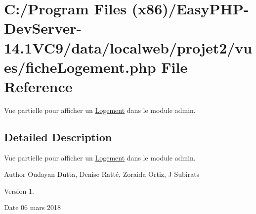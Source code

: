 \hypertarget{fiche_logement_8php}{}\section{C\+:/\+Program Files (x86)/\+Easy\+P\+H\+P-\/\+Dev\+Server-\/14.1\+V\+C9/data/localweb/projet2/vues/fiche\+Logement.php File Reference}
\label{fiche_logement_8php}


Vue partielle pour afficher un \hyperlink{class_logement}{Logement} dans le module admin.  




\subsection{Detailed Description}
Vue partielle pour afficher un \hyperlink{class_logement}{Logement} dans le module admin. 

\begin{DoxyAuthor}{Author}
Oudayan Dutta, Denise Ratté, Zoraida Ortiz, J Subirats 
\end{DoxyAuthor}
\begin{DoxyVersion}{Version}
1. 
\end{DoxyVersion}
\begin{DoxyDate}{Date}
06 mars 2018 
\end{DoxyDate}
